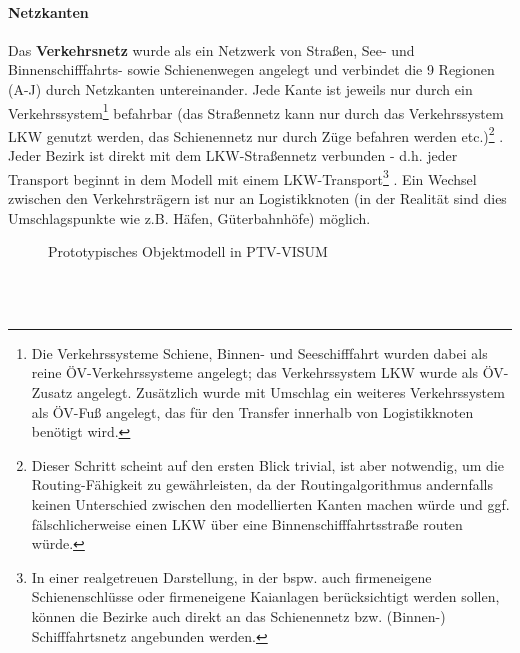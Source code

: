 \paragraph{Netzkanten}
Das \textbf{Verkehrsnetz} wurde als ein Netzwerk von Straßen, See- und Binnenschifffahrts- sowie Schienenwegen angelegt und verbindet die 9 Regionen (A-J) durch Netzkanten untereinander. Jede Kante ist jeweils nur durch ein Verkehrssystem\footnote{%
 Die Verkehrssysteme Schiene, Binnen- und Seeschifffahrt wurden dabei als reine ÖV-Verkehrssysteme angelegt; das Verkehrssystem LKW wurde als ÖV-Zusatz angelegt. Zusätzlich wurde mit Umschlag ein weiteres Verkehrssystem als ÖV-Fuß angelegt, das für den Transfer innerhalb von Logistikknoten benötigt wird.
}%
 befahrbar (das Straßennetz kann nur durch das Verkehrssystem LKW genutzt werden, das Schienennetz nur durch Züge befahren werden etc.)\footnote{%
 Dieser Schritt scheint auf den ersten Blick trivial, ist aber notwendig, um die Routing-Fähigkeit zu gewährleisten, da der Routingalgorithmus andernfalls keinen Unterschied zwischen den modellierten Kanten machen würde und ggf. fälschlicherweise einen LKW über eine Binnenschifffahrtsstraße routen würde.
}%
. Jeder Bezirk ist direkt mit dem LKW-Straßennetz verbunden - d.h. jeder Transport beginnt in dem Modell mit einem LKW-Transport\footnote{%
 In einer realgetreuen Darstellung, in der bspw. auch firmeneigene Schienenschlüsse oder firmeneigene Kaianlagen berücksichtigt werden sollen, können die Bezirke auch direkt an das Schienennetz bzw. (Binnen-) Schifffahrtsnetz angebunden werden.
}%
. Ein Wechsel zwischen den Verkehrsträgern ist nur an Logistikknoten (in der Realität sind dies Umschlagspunkte wie z.B. Häfen, Güterbahnhöfe) möglich.~\\

\begin{figure}[htbp]
  \centering
  \caption{ Prototypisches Objektmodell in PTV-VISUM}
  \label{_Ref366257341}
\end{figure}
~\\

\newpage
~\\


% 

